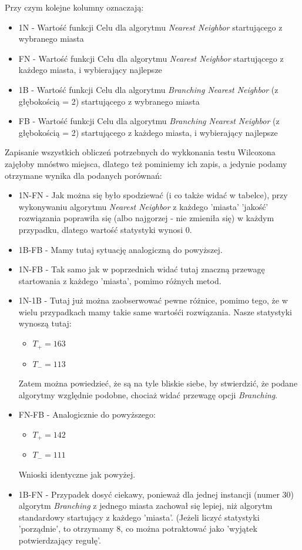 \documentclass{article}
\begin{document}
Przy czym kolejne kolumny oznaczają:
\begin{itemize}
	\item 1N - Wartość funkcji Celu dla algorytmu \textit{Nearest Neighbor} startującego z wybranego miasta
	\item FN - Wartość funkcji Celu dla algorytmu \textit{Nearest Neighbor} startującego z każdego miasta, i wybierający najlepsze
	\item 1B - Wartość funkcji Celu dla algorytmu \textit{Branching Nearest Neighbor} (z głębokością = 2) startującego z wybranego miasta
	\item FB - Wartość funkcji Celu dla algorytmu \textit{Branching Nearest Neighbor} (z głębokością = 2) startującego z każdego miasta, i wybierający najlepsze
\end{itemize}

Zapisanie wszystkich obliczeń potrzebnych do wykkonania testu Wilcoxona zajęłoby mnóstwo miejsca, dlatego też pominiemy ich zapis, a jedynie podamy otrzymane wynika dla podanych porównań:
\begin{itemize}
	\item 1N-FN - Jak można się było spodziewać (i co także widać w tabelce), przy wykonywaniu algorytmu \textit{Nearest Neighbor} z każdego  'miasta' 'jakość' rozwiązania poprawiła się (albo najgorzej - nie zmieniła się) w każdym przypadku, dlatego wartość statystyki wynosi 0.
	\item 1B-FB - Mamy tutaj sytuację analogiczną do powyższej.
	\item 1N-FB - Tak samo jak w poprzednich widać tutaj znaczną przewagę startowania z każdego 'miasta', pomimo różnych metod.
	\item 1N-1B - Tutaj już można zaobserwować pewne różnice, pomimo tego, że w wielu przypadkach mamy takie same wartośći rozwiązania. Nasze statystyki wynoszą tutaj:
	\begin{itemize}
		\item $T_+ = 163$
		\item $T_- = 113$
	\end{itemize}
	Zatem można powiedzieć, że są na tyle bliskie siebe, by stwierdzić, że podane algorytmy względnie podobne, chociaż widać przewagę opcji \textit{Branching}.
	\item FN-FB - Analogicznie do powyższego:
	\begin{itemize}
		\item $T_+ = 142$
		\item $T_- = 111$
	\end{itemize}
	Wnioski identyczne jak powyżej.
	\item 1B-FN - Przypadek dosyć ciekawy, ponieważ dla jednej instancji (numer 30) algorytm \textit{Branching} z jednego miasta zachował się lepiej, niż algorytm standardowy startujący z każdego 'miasta'. (Jeżeli liczyć statystyki 'porządnie', to otrzymamy $8$, co można potraktować jako 'wyjątek potwierdzający regułę'.
\end{itemize}
\end{document}
